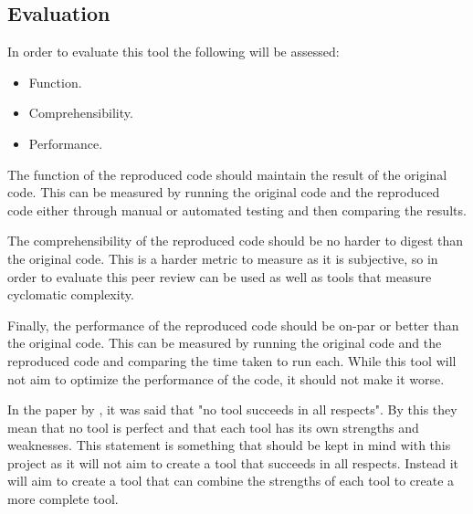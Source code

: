 \subsection{Evaluation}

In order to evaluate this tool the following will be assessed:
\begin{itemize}
	\item Function.
	\item Comprehensibility.
	\item Performance.
\end{itemize}
The function of the reproduced code should maintain the result of the original code. This can be measured by running the original code and the reproduced code either through manual or automated testing and then comparing the results.

The comprehensibility of the reproduced code should be no harder to digest than the original code. This is a harder metric to measure as it is subjective, so in order to evaluate this peer review can be used as well as tools that measure cyclomatic complexity.

Finally, the performance of the reproduced code should be on-par or better than the original code. This can be measured by running the original code and the reproduced code and comparing the time taken to run each. While this tool will not aim to optimize the performance of the code, it should not make it worse.

In the paper by \cite{8681007}, it was said that "no tool succeeds in all respects". By this they mean that no tool is perfect and that each tool has its own strengths and weaknesses. This statement is something that should be kept in mind with this project as it will not aim to create a tool that succeeds in all respects. Instead it will aim to create a tool that can combine the strengths of each tool to create a more complete tool.